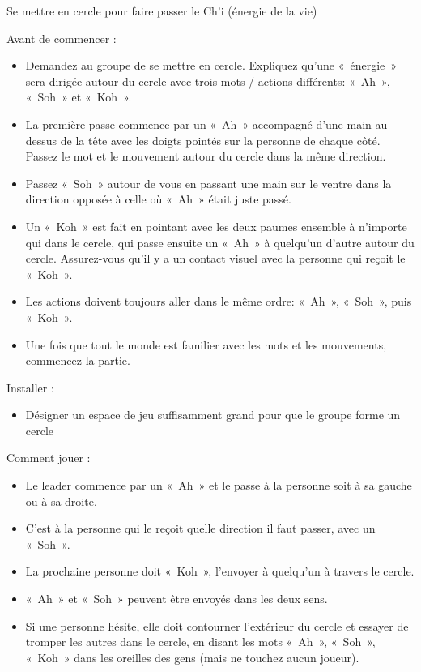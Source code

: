 \documentclass{grand-jeu}
\begin{document}
\begin{regles}
Se mettre en cercle pour faire passer le Ch'i (énergie de la vie)

Avant de commencer :
\begin{itemize}
    \item{Demandez au groupe de se mettre en cercle. Expliquez qu'une « énergie » sera dirigée autour du cercle avec trois mots / actions différents: « Ah », « Soh » et « Koh ».}
    \item{La première passe commence par un « Ah » accompagné d'une main au-dessus de la tête avec les doigts pointés sur la personne de chaque côté. Passez le mot et le mouvement autour du cercle dans la même direction.}
    \item{Passez « Soh » autour de vous en passant une main sur le ventre dans la direction opposée à celle où « Ah » était juste passé.}
    \item{Un « Koh » est fait en pointant avec les deux paumes ensemble à n'importe qui dans le cercle, qui passe ensuite un « Ah » à quelqu'un d'autre autour du cercle. Assurez-vous qu'il y a un contact visuel avec la personne qui reçoit le « Koh ».}
    \item{Les actions doivent toujours aller dans le même ordre: « Ah », « Soh », puis « Koh ».}
    \item{Une fois que tout le monde est familier avec les mots et les mouvements, commencez la partie.}
\end{itemize}
Installer :
\begin{itemize}
    \item{Désigner un espace de jeu suffisamment grand pour que le groupe forme un cercle}
\end{itemize}
Comment jouer :
\begin{itemize}
    \item{Le leader commence par un « Ah » et le passe à la personne soit à sa gauche ou à sa droite.}
    \item{C'est à la personne qui le reçoit quelle direction il faut passer, avec un « Soh ».}
    \item{La prochaine personne doit « Koh », l'envoyer à quelqu'un à travers le cercle.}
    \item{« Ah » et « Soh » peuvent être envoyés dans les deux sens.}
    \item{Si une personne hésite, elle doit contourner l'extérieur du cercle et essayer de tromper les autres dans le cercle, en disant les mots « Ah », « Soh », « Koh » dans les oreilles des gens (mais ne touchez aucun joueur).}
\end{itemize}
\end{regles}

\begin{moments-stop}
\end{moments-stop}
\end{document}

